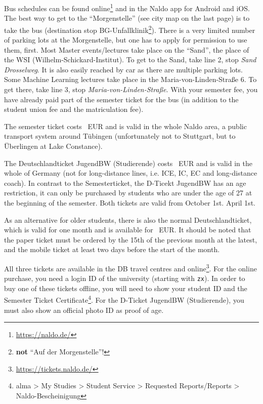 \ifml
    Bus schedules can be found online\footnote{\url{https://naldo.de/}} and in the Naldo app for Android and iOS.\\
    The best way to get to the "`Morgenstelle"' (see city map on the last page) is to take the bus (destination stop BG-Unfallklinik\footnote{\textbf{not} "`Auf der Morgenstelle"'!}). There is a very limited number of parking lots at the Morgenstelle, but one has to apply for permission to use them, first.
    Most Master events/lectures take place on the "`Sand"', the place of the WSI (Wilhelm-Schickard-Institut). To get to the Sand, take line 2, stop \emph{Sand Drosselweg}. It is also easily reached by car as there are multiple parking lots.
    Some Machine Learning lectures take place in the Maria-von-Linden-Straße 6. To get there, take line 3, stop \emph{Maria-von-Linden-Straße}.
    With your semester fee, you have already paid part of the semester ticket for the bus (in addition to the student union fee and the matriculation fee).
    
    The semester ticket costs \semesterticketpreis~EUR and is valid in the whole Naldo area, a public transport system around
    Tübingen (unfortunately not to Stuttgart, but to Überlingen at Lake Constance).
    
    The Deutschlandticket JugendBW (Studierende) costs \jugendticketbwpreis~EUR and is valid in the whole of Germany (not for long-distance lines, i.e. ICE, IC, EC and long-distance coach).
    In contrast to the Semesterticket, the D-Ticekt JugendBW has an age restriction, it can only be purchased by students who are under the age of 27 at the beginning of the semester.
    Both tickets are valid from
    \ifwintersemester
    October 1st.
    \fi
    \ifsommersemester
    April 1st.
    \fi

    As an alternative for older students, there is also the normal Deutschlandticket, which is valid for one month and is available for \detickettuepreis~EUR. 
    It should be noted that the paper ticket must be ordered by the 15th of the previous month at the latest, and the mobile ticket at least two days before the start of the month.

    All three tickets are available in the DB travel centres and online\footnote{\url{https://tickets.naldo.de/}}. For the online purchase, you need a login ID of the university (starting with \texttt{zx}).
    In order to buy one of these tickets offline, you will need to show your student ID and the Semester Ticket Certificate\footnote{alma > My Studies > Student Service > Requested Reports/Reports > Naldo-Bescheinigung}. For the D-Ticket JugendBW (Studierende), you must also show an official photo ID as proof of age.\\
    

